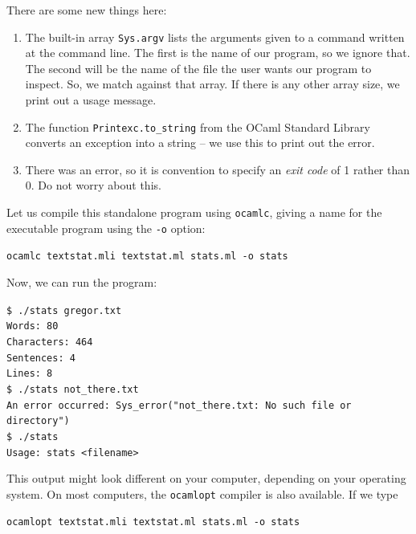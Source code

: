 \documentclass[]{book}
\newcommand{\smspace}{\vspace{4mm}}
\begin{document}
\noindent There are some new things here:

\begin{enumerate}
  \item The built-in array \texttt{Sys.argv} lists the arguments given to a command written at the command line. The first is the name of our program, so we ignore that. The second will be the name of the file the user wants our program to inspect. So, we match against that array. If there is any other array size, we print out a usage message.
  \item The function \texttt{Printexc.to\_string} from the OCaml Standard Library converts an exception into a string -- we use this to print out the error.
  \item There was an error, so it is convention to specify an \textit{exit code} of 1 rather than 0. Do not worry about this.
\end{enumerate}

\noindent Let us compile this standalone program using \texttt{ocamlc}, giving a name for the executable program using the \texttt{-o} option:

\smspace
{}\texttt{ocamlc textstat.mli textstat.ml stats.ml -o stats}
\smspace

\noindent Now, we can run the program:

\smspace
\noindent\texttt{\$ ./stats gregor.txt}\\
\noindent\texttt{Words:\ 80}\\
\noindent\texttt{Characters:\ 464}\\
\noindent\texttt{Sentences:\ 4}\\
\noindent\texttt{Lines:\ 8}\\

\noindent\texttt{\$ ./stats not\_there.txt}\\
\noindent\texttt{An error occurred:\ Sys\_error("not\_there.txt: No such file or directory")}\\

\noindent\texttt{\$ ./stats}\\
\noindent\texttt{Usage:\ stats <filename>}\vphantom{g}
\smspace

\noindent This output might look different on your computer, depending on your operating system. On most computers, the \texttt{ocamlopt} compiler is also available. If we type

\smspace
\texttt{ocamlopt textstat.mli textstat.ml stats.ml -o stats}
\smspace
\end{document}
